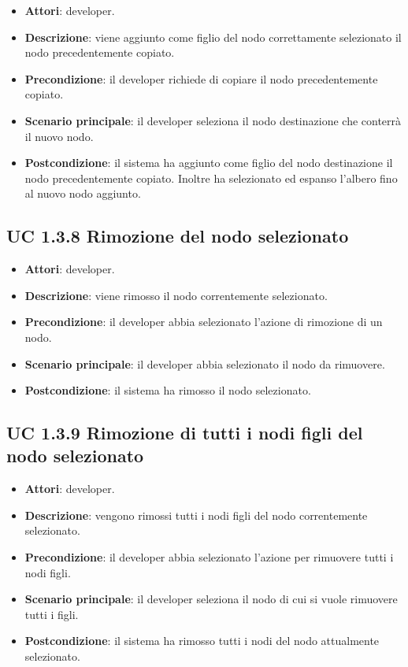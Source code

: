 		\begin{itemize}
			\item\textbf{Attori}: developer.
			\item\textbf{Descrizione}: viene aggiunto come figlio del nodo correttamente selezionato il nodo precedentemente copiato.
			\item\textbf{Precondizione}: il developer richiede di copiare il nodo precedentemente copiato.
			\item\textbf{Scenario principale}: il developer seleziona il nodo destinazione che conterrà il nuovo nodo.
			\item\textbf{Postcondizione}: il sistema ha aggiunto come figlio del nodo destinazione il nodo precedentemente copiato. Inoltre ha selezionato ed espanso l'albero fino al nuovo nodo aggiunto.
		\end{itemize}
		
	\subsection{UC 1.3.8 Rimozione del nodo selezionato}
		\label{subsec:XEUC1.3.8}
		
		\begin{itemize}
			\item\textbf{Attori}: developer.
			\item\textbf{Descrizione}: viene rimosso il nodo correntemente selezionato.
			\item\textbf{Precondizione}: il developer abbia selezionato l'azione di rimozione di un nodo.
			\item\textbf{Scenario principale}: il developer abbia selezionato il nodo da rimuovere.
			\item\textbf{Postcondizione}: il sistema ha rimosso il nodo selezionato.
		\end{itemize}
		
	\subsection{UC 1.3.9 Rimozione di tutti i nodi figli del nodo selezionato}
		\label{subsec:XEUC1.3.9}
		
		\begin{itemize}
			\item\textbf{Attori}: developer.
			\item\textbf{Descrizione}: vengono rimossi tutti i nodi figli del nodo correntemente selezionato.
			\item\textbf{Precondizione}: il developer abbia selezionato l'azione per rimuovere tutti i nodi figli.
			\item\textbf{Scenario principale}: il developer seleziona il nodo di cui si vuole rimuovere tutti i figli.
			\item\textbf{Postcondizione}: il sistema ha rimosso tutti i nodi del nodo attualmente selezionato.
		\end{itemize}
		
